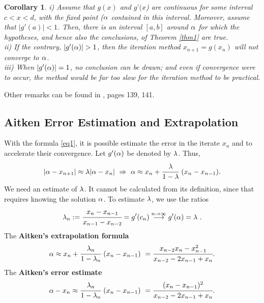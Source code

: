 \documentclass[12pt]{article}
\theoremstyle{theorem}
\newtheorem{cor}{Corollary}
\begin{document}
\begin{shaded}
\begin{cor}
i) Assume that $g(x)$ and $g’(x$) are continuous for some interval $c<x<d$, with the fixed point ($\alpha$ contained in this interval. Moreover, assume that $|g'(a)| < 1$. Then, there is an interval $[a, b]$ around $\alpha$ for which the hypotheses, and hence also the conclusions, of Theorem \ref{thm1} are true. \\
ii) If the contrary, $|g'(\alpha)| > 1$, then the iteration method $x_{n+1} = g(x_n)$ will not converge to $\alpha$. \\
iii) When $|g'(\alpha)| = 1$, no conclusion can be drawn; and even if convergence were to occur, the method would be far too slow for the iteration method to be practical.
\end{cor}
\end{shaded}

Other remarks can be found in \cite{PKA}, pages 139, 141.

\subsection{Aitken Error Estimation and Extrapolation}
With the formula \eqref{eq1}, it is possible estimate the error in the iterate $x_n$ and to accelerate their convergence.
Let $g'(\alpha)$ be denoted by $\lambda$. Thus,
%
\begin{equation}\label{eq2}
|\alpha - x_{n+1}| \approx \lambda |\alpha - x_{n}| \ \Rightarrow \ \alpha \approx x_n + \cfrac{\lambda}{1-\lambda} \ (x_n-x_{n-1}). 
\end{equation} 
%
We need an estimate of $\lambda$. It cannot be calculated from its definition, since that requires knowing the solution $\alpha$. To estimate $\lambda$, we use the ratios
%
\begin{equation}
 \lb_n := \cfrac{x_n-x_{n-1}}{x_{n-1}-x_{n-2}} = g'(c_n) \overset{n\rar \infty}{\longrightarrow} g'(\a) = \lb \ .
\end{equation}
%
The \textbf{Aitken's extrapolation formula}
%
\[ \a \approx x_n + \cfrac{\lb_n}{1-\lb_n} \ (x_n-x_{n-1}) \  = \cfrac{x_{n-2} x_n - x_{n-1}^2}{x_{n-2} - 2 x_{n-1} + x_n}.  \]
%
The \textbf{Aitken's error estimate}
%
\[ \a - x_n \approx \cfrac{\lb_n}{1-\lb_n} \ (x_n-x_{n-1}) \  = \cfrac{ (x_n - x_{n-1})^2}{x_{n-2} - 2 x_{n-1} + x_n}.  \]
%
\end{document}
